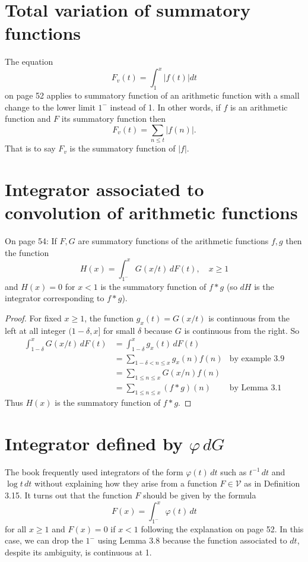 \documentclass{article}
\newcommand{\Abs}[1]{\left| #1 \right|}
\newcommand{\V}{\mathcal{V}}
\begin{document}
\section{Total variation of summatory functions}

The equation
$$F_v(t) = \int_1^x \Abs{ f(t) } dt$$
on page 52 applies to summatory function of an arithmetic function with a small change to the lower limit $1^-$ instead of 1. In other words, if $f$ is an arithmetic function and $F$ its summatory function then
$$F_v(t) = \sum_{n \leq t} \Abs{ f(n) }.$$
That is to say $F_v$ is the summatory function of $\Abs{ f }$.

\section{Integrator associated to convolution of arithmetic functions}

On page 54: If $F, G$ are summatory functions of the arithmetic functions $f, g$ then the function
$$H(x) = \int_{1^-}^x G(x/t) \, dF(t), \quad x \geq 1$$
and $H(x) = 0$ for $x < 1$ is the summatory function of $f * g$ (so $dH$ is the integrator corresponding to $f * g$).

\begin{proof}
For fixed $x \geq 1$, the function $g_x(t) = G(x/t)$ is continuous from the left at all integer $(1-\delta, x]$ for small $\delta$ because $G$ is continuous from the right. So
\begin{align*}
\int_{1-\delta}^x G(x/t) \, dF(t) &= \int_{1-\delta}^x g_x(t) \, dF(t)\\
&= \sum_{1 - \delta < n \leq x} g_x(n) f(n) &\text{by example 3.9}\\
&= \sum_{1 \leq n \leq x} G(x/n) f(n)\\
&= \sum_{1 \leq n \leq x} (f * g)(n) &\text{by Lemma 3.1}
\end{align*}
Thus $H(x)$ is the summatory function of $f * g$.
\end{proof}

\section{Integrator defined by $\varphi \, dG$}

The book frequently used integrators of the form $\varphi(t) \, dt$ such as $t^{-1} \, dt$ and $\log t \, dt$ without explaining how they arise from a function $F \in \V$ as in Definition 3.15. It turns out that the function $F$ should be given by the formula
$$F(x) = \int_{1^-}^x \varphi(t) \, dt$$
for all $x \geq 1$ and $F(x) = 0$ if $x < 1$ following the explanation on page 52. In this case, we can drop the $1^-$ using Lemma 3.8 because the function associated to $dt$, despite its ambiguity, is continuous at 1.
\end{document}
